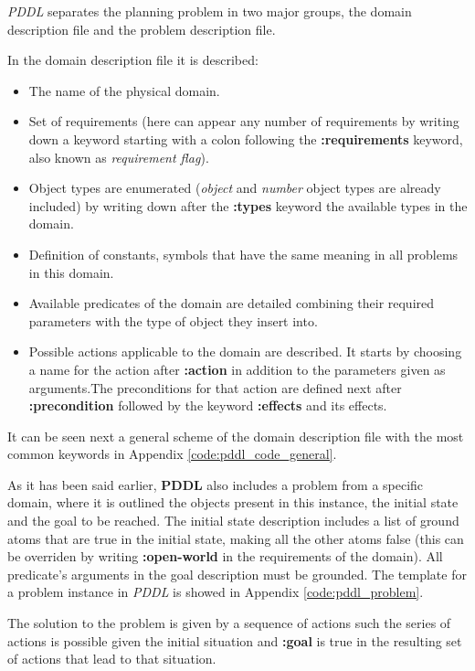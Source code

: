 \textit{PDDL} separates the planning problem in two major groups,
the domain description file and the problem description file.

In the domain description file it is described:
\begin{itemize}
    \item The name of the physical domain.
    \item Set of requirements (here can appear any number of requirements by
    writing down a keyword starting with a colon following the
    \textbf{:requirements} keyword, also known as \textit{requirement flag}).
    \item Object types are enumerated (\textit{object} and \textit{number}
    object types are already included) by writing down after the \textbf{:types}
    keyword the available types in the domain.
    \item Definition of constants, symbols that have the same meaning in all
    problems in this domain.
    \item Available predicates of the domain are detailed combining their
    required parameters with the type of object they insert into.
    \item Possible actions applicable to the domain are described. It starts
    by choosing a name for the action after \textbf{:action} in addition to the
    parameters given as arguments.The preconditions for that action are defined
    next after \textbf{:precondition} followed by the keyword \textbf{:effects}
    and its effects.
\end{itemize}
It can be seen next a general scheme of the domain description file with the
most common keywords in Appendix \ref{code:pddl_code_general}.

As it has been said earlier, \textbf{PDDL} also includes a problem from a
specific domain, where it is outlined the objects present in this instance, the
initial state and the goal to be reached. The initial state description includes
a list of ground atoms that are true in the initial state, making all
the other atoms false (this can be overriden by writing \textbf{:open-world} in
the requirements of the domain). All predicate's arguments in the goal
description must be grounded. The template for a problem instance in
\textit{PDDL} is showed in Appendix \ref{code:pddl_problem}.

The solution to the problem is given by a sequence of actions such the series of
actions is possible given the initial situation and \textbf{:goal} is true in
the resulting set of actions that lead to that situation.

